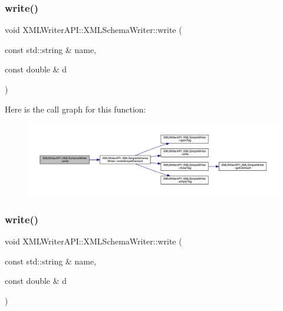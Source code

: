 \subsubsection{\texorpdfstring{write()}{write()}\hspace{0.1cm}{\footnotesize\ttfamily [11/15]}}
{\footnotesize\ttfamily void X\+M\+L\+Writer\+A\+P\+I\+::\+X\+M\+L\+Schema\+Writer\+::write (\begin{DoxyParamCaption}\item[{const std\+::string \&}]{name,  }\item[{const double \&}]{d }\end{DoxyParamCaption})\hspace{0.3cm}{\ttfamily [inline]}}

Here is the call graph for this function\+:
\nopagebreak
\begin{figure}[H]
\begin{center}
\leavevmode
\includegraphics[width=350pt]{db/d34/classXMLWriterAPI_1_1XMLSchemaWriter_aaa0138613c826e77a63e5195bc742f07_cgraph}
\end{center}
\end{figure}
\mbox{\label{classXMLWriterAPI_1_1XMLSchemaWriter_aaa0138613c826e77a63e5195bc742f07}} 
\subsubsection{\texorpdfstring{write()}{write()}\hspace{0.1cm}{\footnotesize\ttfamily [12/15]}}
{\footnotesize\ttfamily void X\+M\+L\+Writer\+A\+P\+I\+::\+X\+M\+L\+Schema\+Writer\+::write (\begin{DoxyParamCaption}\item[{const std\+::string \&}]{name,  }\item[{const double \&}]{d }\end{DoxyParamCaption})\hspace{0.3cm}{\ttfamily [inline]}}

